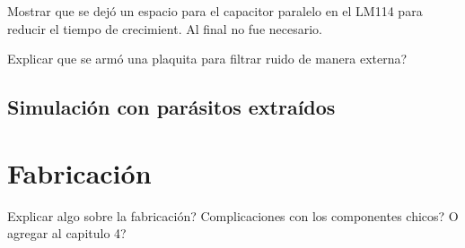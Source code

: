 Mostrar que se dejó un espacio para el capacitor paralelo en el LM114 para
reducir el tiempo de crecimient. Al final no fue necesario.

Explicar que se armó una plaquita para filtrar ruido de manera externa?

\subsection{Simulación con parásitos extraídos}

\section{Fabricación}

Explicar algo sobre la fabricación? Complicaciones con los componentes chicos?
O agregar al capitulo 4?
